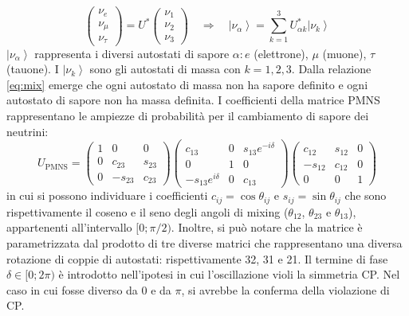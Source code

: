 \begin{equation}
    \left(\begin{array}{l} \nu_e\\\nu_\mu\\\nu_\tau
    \end{array}\right)=U^*\left(\begin{array}{l} \nu_1\\\nu_2\\\nu_3
    \end{array}\right)\quad \Rightarrow\quad\left|\nu_\alpha\right\rangle=\sum_{k=1}^{3}U^*_{\alpha k}\left|\nu_k\right\rangle
    \label{eq:mix}
\end{equation}
$\left|\nu_\alpha\right\rangle$ rappresenta i diversi autostati di sapore $\alpha: e$ (elettrone), $\mu$ (muone), $\tau$ (tauone). I $\left|\nu_k\right\rangle$ sono gli autostati di massa con $k=1,2,3$. Dalla relazione \ref{eq:mix} emerge che ogni autostato di massa non ha sapore definito e ogni autostato di sapore non ha massa definita. I coefficienti della matrice PMNS rappresentano le ampiezze di probabilità per il cambiamento di sapore dei neutrini:
\begin{equation}
    U_{\text{PMNS}}={\begin{pmatrix}1&0&0\\0&c_{23}&s_{23}\\0&-s_{23}&c_{23}\end{pmatrix}}{\begin{pmatrix}c_{13}&0&s_{13}e^{-i\delta }\\0&1&0\\-s_{13}e^{i\delta }&0&c_{13}\end{pmatrix}}{\begin{pmatrix}c_{12}&s_{12}&0\\-s_{12}&c_{12}&0\\0&0&1\end{pmatrix}}
    \label{eq:PMNS}
\end{equation}
in cui si possono individuare i coefficienti $c_{ij}=\cos{\theta_{ij}}$ e $s_{ij}=\sin{\theta_{ij}}$ che sono rispettivamente il coseno e il seno degli angoli di mixing ($\theta_{12}$, $ \theta_{23}$ e $\theta_{13}$), appartenenti all'intervallo $[0;\pi/2)$. Inoltre, si può notare che la matrice è parametrizzata dal prodotto di tre diverse matrici che rappresentano una diversa rotazione di coppie di autostati: rispettivamente 32, 31 e 21. Il termine di fase $\delta\in[0;2\pi)$ è introdotto nell'ipotesi in cui l'oscillazione violi la simmetria CP. Nel caso in cui fosse diverso da 0 e da $\pi$, si avrebbe la conferma della violazione di CP.
